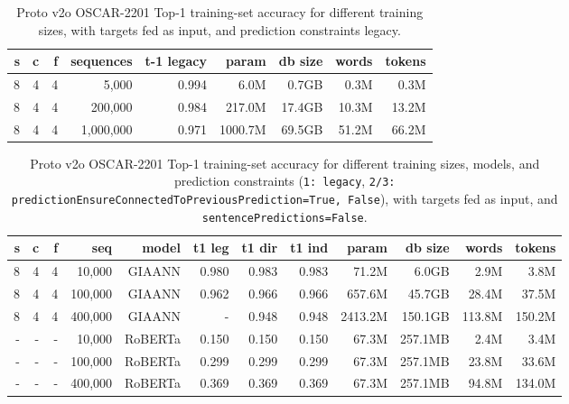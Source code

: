 \begin{table}[H]
\centering
\caption{Proto v2o OSCAR-2201 Top-1 training-set accuracy for different training sizes, with targets fed as input, and prediction constraints legacy.}
\label{tab:protov2o-oscar-train-top1-accuracy-inferenceLeakyIntegrateAndFire}
\begin{tabular}{rrrrrrrrr}
\toprule
\textbf{s} & \textbf{c} & \textbf{f} & \textbf{sequences} & \textbf{t-1 legacy} & \textbf{param} & \textbf{db size} & \textbf{words} & \textbf{tokens} \\
\midrule
8 & 4 & 4 & 5,000     & 0.994 & 6.0M & 0.7GB & 0.3M & 0.3M \\
8 & 4 & 4 & 200,000   & 0.984 & 217.0M  & 17.4GB & 10.3M & 13.2M \\
8 & 4 & 4 & 1,000,000 & 0.971 & 1000.7M & 69.5GB & 51.2M & 66.2M \\
\bottomrule
\end{tabular}
\end{table}

\begin{table}[H]
\centering
\caption{Proto v2o OSCAR-2201 Top-1 training-set accuracy for different training sizes, models, and prediction constraints (\texttt{1: legacy}, \texttt{2/3: predictionEnsureConnectedToPreviousPrediction=True, False}), with targets fed as input, and \texttt{sentencePredictions=False}.}
\label{tab:protov2o-oscar-train-top1-accuracy-models-inferenceLeakyIntegrateAndFire-predictionConstraints}
\begin{tabular}{rrrrrrrrrrrr}
\toprule
\textbf{s} & \textbf{c} & \textbf{f} & \textbf{seq} & \textbf{model} & \textbf{t1 leg} & \textbf{t1 dir} & \textbf{t1 ind} & \textbf{param} & \textbf{db size} & \textbf{words} & \textbf{tokens} \\
\midrule
8 & 4 & 4 & 10,000  & GIAANN & 0.980 & 0.983 & 0.983 & 71.2M & 6.0GB & 2.9M & 3.8M \\
8 & 4 & 4 & 100,000 & GIAANN & 0.962 & 0.966 & 0.966 & 657.6M & 45.7GB & 28.4M & 37.5M \\
8 & 4 & 4 & 400,000 & GIAANN & - & 0.948 & 0.948 & 2413.2M & 150.1GB & 113.8M & 150.2M \\
- & - & - & 10,000  & RoBERTa & 0.150 & 0.150 & 0.150 & 67.3M & 257.1MB & 2.4M & 3.4M \\
- & - & - & 100,000 & RoBERTa & 0.299 & 0.299 & 0.299 & 67.3M & 257.1MB & 23.8M & 33.6M \\
- & - & - & 400,000 & RoBERTa & 0.369 & 0.369 & 0.369 & 67.3M & 257.1MB & 94.8M & 134.0M \\
\bottomrule
\end{tabular}
\end{table}


